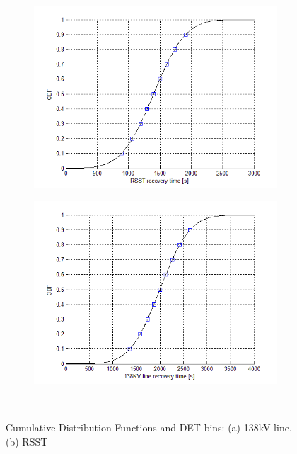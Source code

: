 \begin{figure}
        \centering %
        ~ %
        \begin{subfigure}[b]{0.48\textwidth}
                \centering
                \includegraphics[width=\textwidth]{figures/RSSTDist.png}
                \caption{}
                \label{fig:RSSTDist}
        \end{subfigure}
        \begin{subfigure}[b]{0.48\textwidth}
                \centering
                \includegraphics[width=\textwidth]{figures/138kVlineDist.png}
                \caption{}
                \label{fig:138kVlineDist}
        \end{subfigure}
        ~ %
        \caption{Cumulative Distribution Functions and DET bins: (a) 138kV line, (b) RSST}\label{fig:CDFsACs}
\end{figure}
